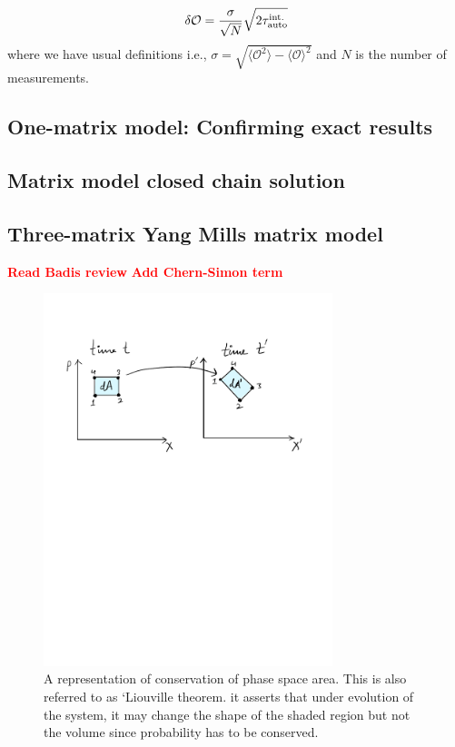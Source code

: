 \documentclass[11pt]{article}
\newcommand{\TODO}[1]{\textcolor{red}{{\bf #1}}}
\begin{document}
\begin{equation}
	\delta \mathcal{O} = \frac{\sigma}{\sqrt{N}} \sqrt{2 \tau_{\rm{auto}}^{\rm{int.}}}
\end{equation}
where we have usual definitions i.e., 
$\sigma = \sqrt{\langle \mathcal{O}^2\rangle - \langle \mathcal{O}\rangle^{2}}$ and $N$ is the number of measurements. 




\subsection{One-matrix model: Confirming exact results} 

\subsection{Matrix model closed chain solution} 

\subsection{Three-matrix Yang Mills matrix model}

\TODO{Read Badis review} 
\TODO{Add Chern-Simon term}




\begin{figure}[htbp] 
\centering 
\includegraphics[width=0.75\textwidth]{figs/PSP.pdf}
\caption{\label{fig:F1}A representation of conservation of phase space area. This is also referred to as `Liouville theorem. it asserts that under evolution of the system, it may change the shape of the shaded region but not the volume since probability has to be conserved. }
\end{figure}
\end{document}
